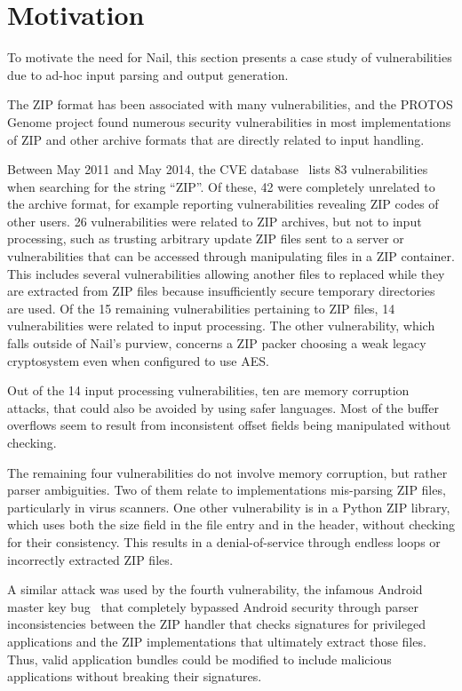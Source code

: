 \section{Motivation}
\label{s:motivation}

To motivate the need for Nail, this section presents a case study of
vulnerabilities due to ad-hoc input parsing and output generation.

The ZIP format has been associated with many vulnerabilities, and the
PROTOS Genome project found numerous security vulnerabilities in most
implementations of ZIP and other archive formats that are directly
related to input handling.

Between May 2011 and May 2014, the CVE database~\cite{cve-database} lists
83 vulnerabilities when searching for the string ``ZIP''. Of these, 42
were completely unrelated to the archive format, for example reporting
vulnerabilities revealing ZIP codes of other users. 26 vulnerabilities
were related to ZIP archives, but not to input processing, such as
trusting arbitrary update ZIP files sent to a server or vulnerabilities
that can be accessed through manipulating files in a ZIP container. This
includes several vulnerabilities allowing another files to replaced while
they are extracted from ZIP files because insufficiently secure temporary
directories are used. Of the 15 remaining vulnerabilities pertaining
to ZIP files, 14 vulnerabilities were related to input processing. The
other vulnerability, which falls outside of Nail's purview, concerns a
ZIP packer choosing a weak legacy cryptosystem even when configured to
use AES.

Out of the 14 input processing vulnerabilities, ten are memory corruption
attacks, that could also be avoided by using safer languages.  Most of
the buffer overflows seem to result from inconsistent offset fields
being manipulated without checking.

The remaining four vulnerabilities do not involve memory corruption,
but rather parser ambiguities.  Two of them relate to implementations
mis-parsing ZIP files, particularly in virus scanners.  One other
vulnerability is in a Python ZIP library, which uses both the size
field in the file entry and in the header, without checking for their
consistency.  This results in a denial-of-service through endless loops
or incorrectly extracted ZIP files.

A similar attack was used by the fourth vulnerability, the infamous
Android master key bug~\cite{saurik-masterkey} that completely
bypassed Android security through parser inconsistencies between the
ZIP handler that checks signatures for privileged applications and the
ZIP implementations that ultimately extract those files. Thus, valid
application bundles could be modified to include malicious applications
without breaking their signatures.



